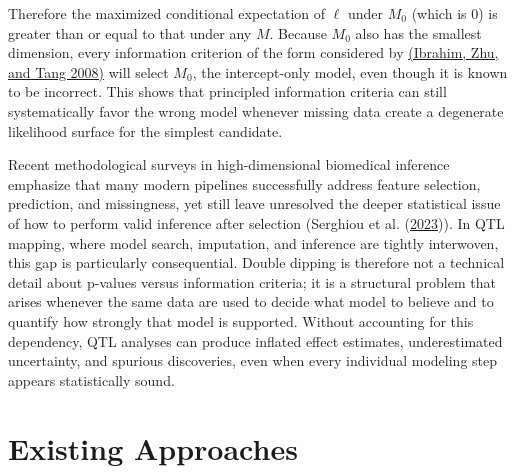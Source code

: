\documentclass[
  12pt,
]{article}
\begin{document}
Therefore the maximized conditional expectation of $\ell$ under $M_0$
(which is $0$) is greater than or equal to that under any $M$. Because
$M_0$ also has the smallest dimension, every information criterion of
the form considered by \protect\hyperlink{ref-IbrahimZhuTang2008}{(Ibrahim, Zhu, and Tang
2008)} will select $M_0$, the
intercept-only model, even though it is known to be incorrect. This
shows that principled information criteria can still systematically
favor the wrong model whenever missing data create a degenerate
likelihood surface for the simplest candidate.

Recent methodological surveys in high-dimensional biomedical inference
emphasize that many modern pipelines successfully address feature
selection, prediction, and missingness, yet still leave unresolved the
deeper statistical issue of how to perform valid inference after
selection (Serghiou et al.
(\protect\hyperlink{ref-Serghiou2023}{2023})). In QTL mapping, where
model search, imputation, and inference are tightly interwoven, this gap
is particularly consequential. Double dipping is therefore not a
technical detail about p-values versus information criteria; it is a
structural problem that arises whenever the same data are used to decide
what model to believe and to quantify how strongly that model is
supported. Without accounting for this dependency, QTL analyses can
produce inflated effect estimates, underestimated uncertainty, and
spurious discoveries, even when every individual modeling step appears
statistically sound.

\section{Existing Approaches}
\end{document}

